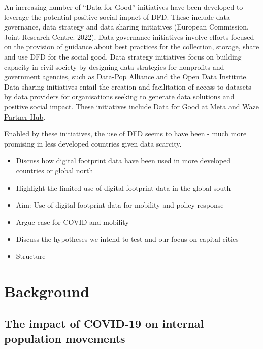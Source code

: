 \documentclass[
  10pt,
  letterpaper,
  DIV=11,
  numbers=noendperiod]{scrartcl}
\begin{document}
An increasing number of ``Data for Good'' initiatives have been
developed to leverage the potential positive social impact of DFD. These
include data governance, data strategy and data sharing initiatives
(European Commission. Joint Research Centre. 2022). Data governance
initiatives involve efforts focused on the provision of guidance about
best practices for the collection, storage, share and use DFD for the
social good. Data strategy initiatives focus on building capacity in
civil society by designing data strategies for nonprofits and government
agencies, such as Data-Pop Alliance and the Open Data Institute. Data
sharing initiatives entail the creation and facilitation of access to
datasets by data providers for organisations seeking to generate data
solutions and positive social impact. These initiatives include
\href{https://dataforgood.facebook.com/dfg/about}{Data for Good at Meta}
and \href{https://www.waze.com/wazeforcities/}{Waze Partner Hub}.

Enabled by these initiatives, the use of DFD seems to have been - much
more promising in less developed countries given data scarcity.

\begin{itemize}
\item
  Discuss how digital footprint data have been used in more developed
  countries or global north
\item
  Highlight the limited use of digital footprint data in the global
  south
\item
  Aim: Use of digital footprint data for mobility and policy response
\item
  Argue case for COVID and mobility
\item
  Discuss the hypotheses we intend to test and our focus on capital
  cities
\item
  Structure
\end{itemize}

\hypertarget{background}{%
\section{Background}\label{background}}

\hypertarget{the-impact-of-covid-19-on-internal-population-movements}{%
\subsection{The impact of COVID-19 on internal population
movements}\label{the-impact-of-covid-19-on-internal-population-movements}}
\end{document}

